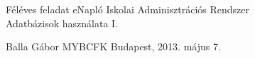 \documentclass[a4paper,14pt]{report}
\begin{document}
\begin{center}
Féléves feladat
{\large eNapló Iskolai Adminisztrációs Rendszer} \\
Adatbázisok használata I.
\end{center}
Balla Gábor
MYBCFK
Budapest, 2013. május 7.
\end{document}
